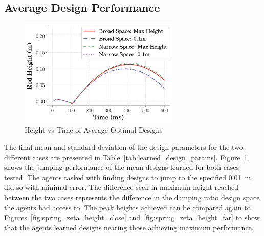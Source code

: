 \documentclass[10pt,twocolumn,letterpaper]{article}
\begin{document}
\subsection{Average Design Performance}
%
\begin{figure}[tb]
        \begin{center}
        \includegraphics[width = 3in]{figures/timeseries/TimeseriesHeight.png}  
        \caption{Height vs Time of Average Optimal Designs}
        \label{fig:height_vs_time}
        \end{center}
        \end{figure}

The final mean and standard deviation of the design parameters for the two different cases are presented in Table~\ref{tab:learned_design_params}. Figure~\ref{fig:height_vs_time} shows the jumping performance of the mean designs learned for both cases tested. The agents tasked with finding designs to jump to the specified 0.01~m, did so with minimal error. The difference seen in maximum height reached between the two cases represents the difference in the damping ratio design space the agents had access to. The peak heights achieved can be compared again to Figures~\ref{fig:spring_zeta_height_close} and~\ref{fig:spring_zeta_height_far} to show that the agents learned designs nearing those achieving maximum performance.
\end{document}
